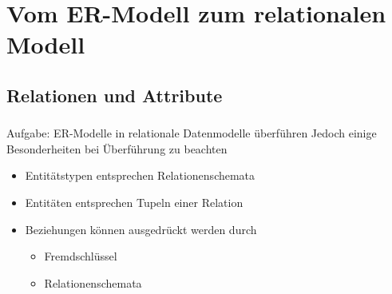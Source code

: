 
\section{Vom ER-Modell zum relationalen Modell}
\subsection*{Relationen und Attribute}

\begin{frame}[t]
\frametitle{\insertsection}
\framesubtitle{\insertsubsection}
\onslide
Aufgabe: ER-Modelle in relationale Datenmodelle \"uberf\"uhren
\nl
Jedoch einige Besonderheiten bei \"Uberf\"uhrung zu beachten
\pause
\abs
 \begin{itemize}
	\item Entit\"atstypen entsprechen Relationenschemata
	\item Entit\"aten entsprechen Tupeln einer Relation 
	\item Beziehungen k\"onnen ausgedr\"uckt werden durch
	 \begin{itemize}
		\item Fremdschl\"ussel
		\item Relationenschemata
	 \end{itemize}
 \end{itemize}
\end{frame}

